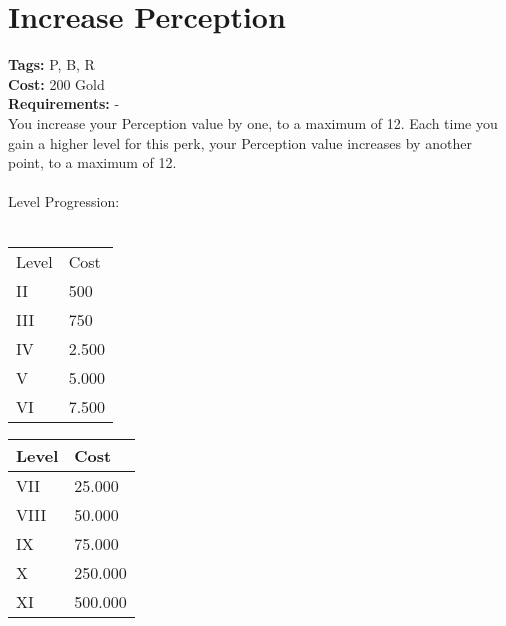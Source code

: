 \section{Increase Perception}\label{sec:increaseperception}
\textbf{Tags:} P, B, R\\
\textbf{Cost:} 200 Gold\\
\textbf{Requirements:} -\\
You increase your Perception value by one, to a maximum of 12.
Each time you gain a higher level for this perk, your Perception value increases by another point, to a maximum of 12.\\
\\
Level Progression:\\
\\
\begin{minipage}{0.5\textwidth}
    \begin{tabular}{l | l}
        Level & Cost\\
        II & 500\\
        III & 750\\
        IV & 2.500\\
        V & 5.000\\
        VI & 7.500\\
    \end{tabular}
\end{minipage}
\begin{minipage}{0.5\textwidth}
    \begin{tabular}{l | l}
        Level & Cost\\ \hline
        VII & 25.000\\
        VIII & 50.000\\
        IX & 75.000\\
        X & 250.000\\
        XI & 500.000\\
    \end{tabular}
\end{minipage}

